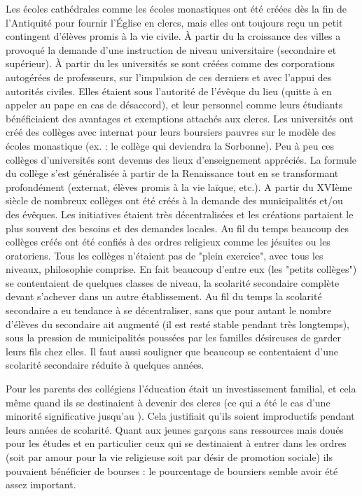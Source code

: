 Les écoles cathédrales comme les écoles monastiques ont été créées dès la fin de l'Antiquité pour fournir l'Église en clercs, mais elles ont toujours reçu un petit contingent d'élèves promis à la vie civile. À partir du  la croissance des villes a provoqué la demande d'une instruction de niveau universitaire (secondaire et supérieur). À partir du  les universités se sont créées comme des corporations autogérées de professeurs, sur l'impulsion de ces derniers et avec l'appui des autorités civiles. Elles étaient sous l'autorité de l'évêque du lieu (quitte à en appeler au pape en cas de désaccord), et leur personnel comme leurs étudiants bénéficiaient des avantages et exemptions attachés aux clercs. Les universités ont créé des collèges avec internat pour leurs boursiers pauvres sur le modèle des écoles monastique (ex. : le collège qui deviendra la Sorbonne). Peu à peu ces collèges d'universités sont devenus des lieux d'enseignement appréciés. La formule du collège s'est généralisée à partir de la Renaissance tout en se transformant profondément (externat, élèves promis à la vie laïque, etc.). A partir du XVIème siècle de nombreux collèges ont été créés à la demande des municipalités et/ou des évêques. Les initiatives étaient très décentralisées et les créations partaient le plus souvent des besoins et des demandes locales. Au fil du temps beaucoup des collèges créés ont été confiés à  des ordres religieux comme les jésuites ou les oratoriens. Tous les collèges n'étaient pas de "plein exercice", avec tous les niveaux, philosophie comprise. En fait beaucoup d'entre eux (les "petits collèges") se contentaient de quelques classes de niveau, la scolarité secondaire complète devant s'achever dans un autre établissement. Au fil du temps la scolarité secondaire a eu tendance à se décentraliser, sans que pour autant le nombre d'élèves du secondaire ait augmenté (il est resté stable pendant très longtemps), sous la pression de municipalités poussées par les familles désireuses de garder leurs fils chez elles. Il faut aussi souligner que beaucoup se contentaient d'une scolarité secondaire réduite à quelques années. 
 
 Pour les parents des collégiens l'éducation était un investissement familial, et cela même quand ils se destinaient à devenir des clercs (ce qui a été le cas d'une minorité significative jusqu'au ). Cela justifiait qu'ils soient improductifs pendant leurs années de scolarité. Quant aux jeunes garçons sans ressources mais doués pour les études et en particulier ceux qui se destinaient à entrer dans les ordres (soit par amour pour la vie religieuse soit par désir de promotion sociale) ils pouvaient bénéficier de bourses : le pourcentage de boursiers semble avoir été assez important.


